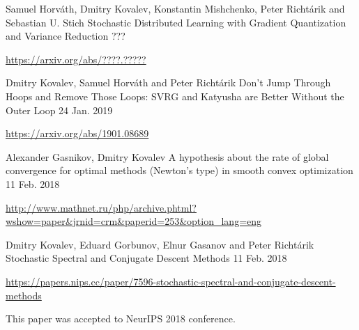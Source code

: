 
\begin{cventries}

\cventry
{Samuel Horváth, Dmitry Kovalev, Konstantin Mishchenko, Peter Richtárik and Sebastian U. Stich} %
{Stochastic Distributed Learning with Gradient Quantization and Variance Reduction} %
{} %
{???} %
{ %
	\begin{cvitems}
		\item {\url{https://arxiv.org/abs/????.?????}}
	\end{cvitems}
}

\cventry
{Dmitry Kovalev, Samuel Horváth and Peter Richtárik} %
{Don't Jump Through Hoops and Remove Those Loops: SVRG and Katyusha are Better Without the Outer Loop} %
{} %
{24 Jan. 2019} %
{ %
	\begin{cvitems}
		\item {\url{https://arxiv.org/abs/1901.08689}}
	\end{cvitems}
}


\cventry
{Alexander Gasnikov, Dmitry Kovalev	} %
{A hypothesis about the rate of global convergence for optimal methods (Newton's type) in smooth convex optimization } %
{} %
{11 Feb. 2018} %
{ %
	\begin{cvitems}
		\item {\url{http://www.mathnet.ru/php/archive.phtml?wshow=paper\&jrnid=crm\&paperid=253\&option\_lang=eng}}
	\end{cvitems}
}


\cventry
{Dmitry Kovalev, Eduard Gorbunov, Elnur Gasanov and Peter Richtárik} %
{Stochastic Spectral and Conjugate Descent Methods} %
{} %
{11 Feb. 2018} %
{ %
\begin{cvitems}
\item {\url{https://papers.nips.cc/paper/7596-stochastic-spectral-and-conjugate-descent-methods}}
\item {This paper was accepted to NeurIPS 2018 conference.}
\end{cvitems}
}



\end{cventries}